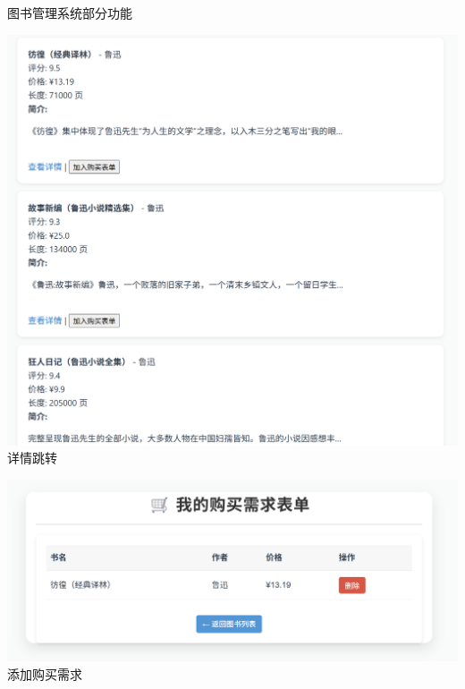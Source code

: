 \documentclass{ctexbeamer}
\begin{document}
\begin{frame}{图书管理系统部分功能}
\begin{minipage}{0.45\textwidth}
    \includegraphics[width=\textwidth]{fig/book3.png}\\ 详情跳转
  \end{minipage}
  \begin{minipage}{0.45\textwidth}
    \includegraphics[width=\textwidth]{fig/book4.png}\\ 添加购买需求
  \end{minipage}
\end{frame}
\end{document}
